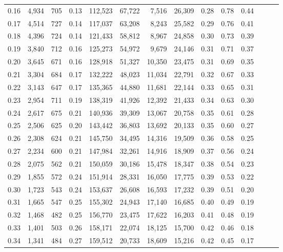 \begin{tabular}{rrrrrrrrrrrrrr}
0.16 &   4,934 &  705 &  0.13 &  112,523 &   67,722 &   7,516 &  26,309 &  0.28 &  0.78 &      0.44 \\
0.17 &   4,514 &  727 &  0.14 &  117,037 &   63,208 &   8,243 &  25,582 &  0.29 &  0.76 &      0.41 \\
0.18 &   4,396 &  724 &  0.14 &  121,433 &   58,812 &   8,967 &  24,858 &  0.30 &  0.73 &      0.39 \\
0.19 &   3,840 &  712 &  0.16 &  125,273 &   54,972 &   9,679 &  24,146 &  0.31 &  0.71 &      0.37 \\
0.20 &   3,645 &  671 &  0.16 &  128,918 &   51,327 &  10,350 &  23,475 &  0.31 &  0.69 &      0.35 \\
0.21 &   3,304 &  684 &  0.17 &  132,222 &   48,023 &  11,034 &  22,791 &  0.32 &  0.67 &      0.33 \\
0.22 &   3,143 &  647 &  0.17 &  135,365 &   44,880 &  11,681 &  22,144 &  0.33 &  0.65 &      0.31 \\
0.23 &   2,954 &  711 &  0.19 &  138,319 &   41,926 &  12,392 &  21,433 &  0.34 &  0.63 &      0.30 \\
0.24 &   2,617 &  675 &  0.21 &  140,936 &   39,309 &  13,067 &  20,758 &  0.35 &  0.61 &      0.28 \\
0.25 &   2,506 &  625 &  0.20 &  143,442 &   36,803 &  13,692 &  20,133 &  0.35 &  0.60 &      0.27 \\
0.26 &   2,308 &  624 &  0.21 &  145,750 &   34,495 &  14,316 &  19,509 &  0.36 &  0.58 &      0.25 \\
0.27 &   2,234 &  600 &  0.21 &  147,984 &   32,261 &  14,916 &  18,909 &  0.37 &  0.56 &      0.24 \\
0.28 &   2,075 &  562 &  0.21 &  150,059 &   30,186 &  15,478 &  18,347 &  0.38 &  0.54 &      0.23 \\
0.29 &   1,855 &  572 &  0.24 &  151,914 &   28,331 &  16,050 &  17,775 &  0.39 &  0.53 &      0.22 \\
0.30 &   1,723 &  543 &  0.24 &  153,637 &   26,608 &  16,593 &  17,232 &  0.39 &  0.51 &      0.20 \\
0.31 &   1,665 &  547 &  0.25 &  155,302 &   24,943 &  17,140 &  16,685 &  0.40 &  0.49 &      0.19 \\
0.32 &   1,468 &  482 &  0.25 &  156,770 &   23,475 &  17,622 &  16,203 &  0.41 &  0.48 &      0.19 \\
0.33 &   1,401 &  503 &  0.26 &  158,171 &   22,074 &  18,125 &  15,700 &  0.42 &  0.46 &      0.18 \\
0.34 &   1,341 &  484 &  0.27 &  159,512 &   20,733 &  18,609 &  15,216 &  0.42 &  0.45 &      0.17 \\

\end{tabular}
